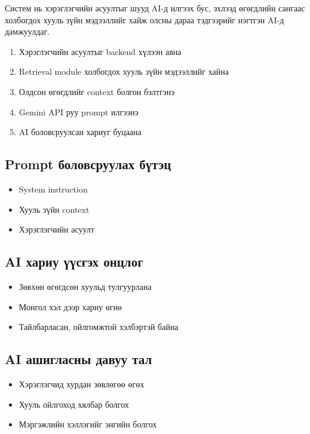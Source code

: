 Систем нь хэрэглэгчийн асуултыг шууд AI-д илгээх бус, эхлээд өгөгдлийн сангаас холбогдох хууль зүйн мэдээллийг хайж олсны дараа тэдгээрийг нэгтгэн AI-д дамжуулдаг.

\begin{enumerate}
    \item Хэрэглэгчийн асуултыг backend хүлээн авна
    \item Retrieval module холбогдох хууль зүйн мэдээллийг хайна
    \item Олдсон өгөгдлийг context болгон бэлтгэнэ
    \item Gemini API руу prompt илгээнэ
    \item AI боловсруулсан хариуг буцаана
\end{enumerate}

\subsection{Prompt боловсруулах бүтэц}

\begin{itemize}
    \item System instruction
    \item Хууль зүйн context
    \item Хэрэглэгчийн асуулт
\end{itemize}

\subsection{AI хариу үүсгэх онцлог}

\begin{itemize}
    \item Зөвхөн өгөгдсөн хуульд тулгуурлана
    \item Монгол хэл дээр хариу өгнө
    \item Тайлбарласан, ойлгомжтой хэлбэртэй байна
\end{itemize}

\subsection{AI ашигласны давуу тал}

\begin{itemize}
    \item Хэрэглэгчид хурдан зөвлөгөө өгөх
    \item Хууль ойлгоход хялбар болгох
    \item Мэргэжлийн хэллэгийг энгийн болгох
\end{itemize}

